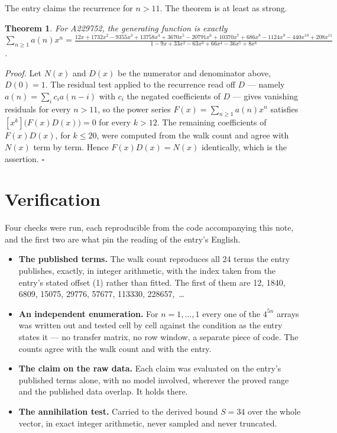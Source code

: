 \documentclass[11pt]{article}
\newtheorem{theorem}{Theorem}
\theoremstyle{definition}
\begin{document}
The entry claims the recurrence for $n > 11$. The theorem is at least as strong.

\begin{theorem} For A229752, the generating function is exactly $\sum_{n\ge 1} a(n)x^n = \frac{12x + 1732x^{2} - 9355x^{3} + 13758x^{4} + 3670x^{5} - 20791x^{6} + 10370x^{7} + 686x^{8} - 1124x^{9} - 440x^{10} + 208x^{11}}{1 - 9x + 33x^{2} - 63x^{3} + 66x^{4} - 36x^{5} + 8x^{6}}$.\end{theorem}

{\itshape Proof.} Let $N(x)$ and $D(x)$ be the numerator and denominator above, $D(0)=1$. The residual test applied to the recurrence read off $D$ --- namely $a(n) = \sum_i c_i a(n-i)$ with $c_i$ the negated coefficients of $D$ --- gives vanishing residuals for every $n > 11$, so the power series $F(x)=\sum_{n\ge 1}a(n)x^n$ satisfies $[x^k]\bigl(F(x)D(x)\bigr) = 0$ for every $k > 12$. The remaining coefficients of $F(x)D(x)$, for $k \le 20$, were computed from the walk count and agree with $N(x)$ term by term. Hence $F(x)D(x) = N(x)$ identically, which is the assertion. $\square$

\section{Verification}

Four checks were run, each reproducible from the code accompanying this note, and the first two are what pin the reading of the entry's English.

\begin{itemize}

\item {\bfseries The published terms.} The walk count reproduces all 24 terms the entry publishes, exactly, in integer arithmetic, with the index taken from the entry's stated offset (1) rather than fitted. The first of them are 12, 1840, 6809, 15075, 29776, 57677, 113330, 228657,~\dots

\item {\bfseries An independent enumeration.} For $n = 1,\dots,1$ every one of the $4^{5n}$ arrays was written out and tested cell by cell against the condition as the entry states it --- no transfer matrix, no row window, a separate piece of code. The counts agree with the walk count and with the entry.

\item {\bfseries The claim on the raw data.} Each claim was evaluated on the entry's published terms alone, with no model involved, wherever the proved range and the published data overlap. It holds there.

\item {\bfseries The annihilation test.} Carried to the derived bound $S = 34$ over the whole vector, in exact integer arithmetic, never sampled and never truncated.

\end{itemize}
\end{document}
